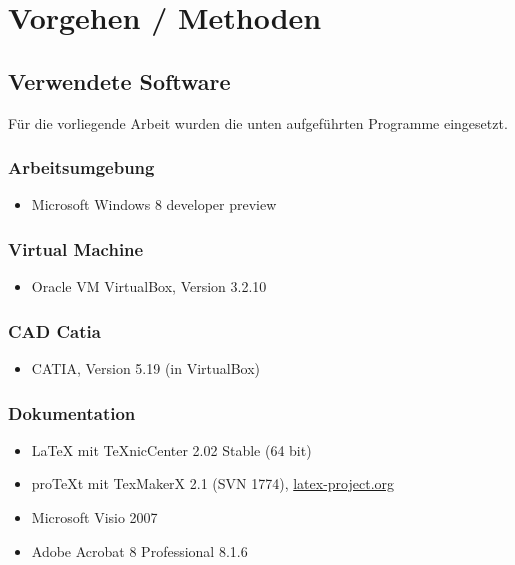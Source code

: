 \chapter{Vorgehen / Methoden}
\label{sec:VorgehenMethoden}

\section{Verwendete Software}
\label{sec:VerwendeteSoftware}
Für die vorliegende Arbeit wurden die unten aufgeführten Programme eingesetzt.

\subsection*{Arbeitsumgebung}\label{wintool}
\begin{itemize}
	\item Microsoft Windows 8 developer preview
\end{itemize}

\subsection*{Virtual Machine}\label{vm}
\begin{itemize}
	\item Oracle VM VirtualBox, Version 3.2.10
\end{itemize}

\subsection*{CAD Catia}\label{catia}
\begin{itemize}
	\item CATIA, Version 5.19 (in VirtualBox)
\end{itemize}

\subsection*{Dokumentation}\label{dokutools}
\begin{itemize}
  \item \LaTeX{} mit TeXnicCenter 2.02 Stable (64 bit)\cite{TeXnicCenter:2014:Online}
	\item proTeXt mit TexMakerX 2.1 (SVN 1774), \href{http://www.latex-project.org/ftp.html}{latex-project.org}
	\item Microsoft Visio 2007
	\item Adobe Acrobat 8 Professional 8.1.6
\end{itemize}
